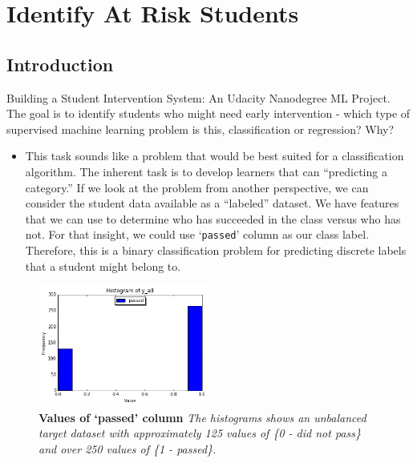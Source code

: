 \documentclass[twoside,openright,titlepage,numbers=noenddot,headinclude,%
               footinclude=true,cleardoublepage=empty,abstractoff,BCOR=5mm,%
               paper=a4,fontsize=11pt,ngerman,american]{scrreprt}
\numberwithin{theorem}{chapter}
\numberwithin{definition}{chapter}
\numberwithin{algorithm}{chapter}
\numberwithin{figure}{chapter}
\numberwithin{table}{chapter}
\numberwithin{equation}{chapter}
\begin{document}
\frenchspacing
\raggedbottom
{}
\pagestyle{plain}




\cleardoublepage

\chapter *{Identify At Risk Students}




\section*{Introduction}
Building a Student Intervention System: An Udacity Nanodegree ML Project. The goal is to identify students who might need early intervention - which type of supervised machine learning problem is this, classification or regression? Why?

\begin{itemize}%
\item 
This task sounds like a problem that would be best suited for a classification algorithm. The inherent task is to develop learners that can ``predicting a category.'' If we look at the problem from another perspective, we can consider the student data available as a ``labeled'' dataset. We have features that we can use to determine who has succeeded in the class versus who has not. For that insight, we could use `\texttt{passed}' column as our class label. Therefore, this is a binary classification problem for predicting discrete labels that a student might belong to.
\end{itemize}

\begin{figure}[!htbp]
  \centering
    \includegraphics[width=0.5\textwidth]{images/y_all}
\caption{\textbf{Values of `passed' column} \textit{The histograms shows an unbalanced target dataset with approximately 125 values of \{0 - did not pass\} and over 250 values of \{1 - passed\}.}}
\label{y_all}
\end{figure}
\end{document}
